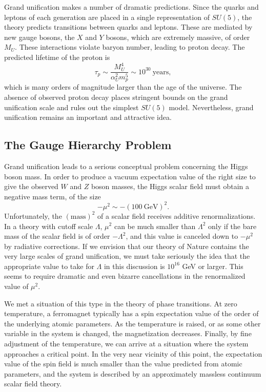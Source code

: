 Grand unification makes a number of dramatic predictions.  Since the quarks
and leptons of each generation are placed in a single representation of
$SU(5)$, the theory predicts transitions between quarks and leptons.  These
are mediated by new gauge bosons, the $X$ and $Y$ bosons, which are
extremely massive, of order $M_U$.  These interactions violate baryon
number, leading to proton decay.  The predicted lifetime of the proton is
\begin{equation}
  \tau_p \sim \frac{M_U^4}{\alpha_U^2 m_p^5} \sim 10^{30}\ \mathrm{years} ,
  \label{eq:22.7}
\end{equation}
which is many orders of magnitude larger than the age of the universe.  The
absence of observed proton decay places stringent bounds on the grand
unification scale and rules out the simplest $SU(5)$ model.  Nevertheless,
grand unification remains an important and attractive idea.

\subsection{The Gauge Hierarchy Problem}

Grand unification leads to a serious conceptual problem concerning the Higgs
boson mass.  In order to produce a vacuum expectation value of the right
size to give the observed $W$ and $Z$ boson masses, the Higgs scalar field
must obtain a negative mass term, of the size
\begin{equation}
  -\mu^2 \sim -(100\ \mathrm{GeV})^2 .
  \label{eq:22.8}
\end{equation}
Unfortunately, the $(\mathrm{mass})^2$ of a scalar field receives additive
renormalizations.  In a theory with cutoff scale $\Lambda$, $\mu^2$ can be
much smaller than $\Lambda^2$ only if the bare mass of the scalar field is of
order $-\Lambda^2$, and this value is canceled down to $-\mu^2$ by radiative
corrections.  If we envision that our theory of Nature contains the very
large scales of grand unification, we must take seriously the idea that the
appropriate value to take for $\Lambda$ in this discussion is $10^{16}$ GeV
or larger.  This seems to require dramatic and even bizarre cancellations in
the renormalized value of $\mu^2$.

We met a situation of this type in the theory of phase transitions.  At zero
temperature, a ferromagnet typically has a spin expectation value of the
order of the underlying atomic parameters.  As the temperature is raised, or
as some other variable in the system is changed, the magnetization
decreases.  Finally, by fine adjustment of the temperature, we can arrive at
a situation where the system approaches a critical point.  In the very near
vicinity of this point, the expectation value of the spin field is much
smaller than the value predicted from atomic parameters, and the system is
described by an approximately massless continuum scalar field theory.

